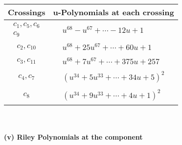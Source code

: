 \documentclass[1p]{elsarticle_modified}
\theoremstyle{definition}
\begin{document}
\begin{tabular}{m{50pt}|m{274pt}}
Crossings & \hspace{64pt}u-Polynomials at each crossing \\
\hline $$\begin{aligned}c_{1},c_{5},c_{6}\\c_{9}\end{aligned}$$&$\begin{aligned}
&u^{68}- u^{67}+\cdots-12 u+1
\end{aligned}$\\
\hline $$\begin{aligned}c_{2},c_{10}\end{aligned}$$&$\begin{aligned}
&u^{68}+25 u^{67}+\cdots+60 u+1
\end{aligned}$\\
\hline $$\begin{aligned}c_{3},c_{11}\end{aligned}$$&$\begin{aligned}
&u^{68}+7 u^{67}+\cdots+375 u+257
\end{aligned}$\\
\hline $$\begin{aligned}c_{4},c_{7}\end{aligned}$$&$\begin{aligned}
&(u^{34}+5 u^{33}+\cdots+34 u+5)^{2}
\end{aligned}$\\
\hline $$\begin{aligned}c_{8}\end{aligned}$$&$\begin{aligned}
&(u^{34}+9 u^{33}+\cdots+4 u+1)^{2}
\end{aligned}$\\
\hline
\end{tabular}\\~\\
\newpage\renewcommand{\arraystretch}{1}
\flushleft \textbf{(v) Riley Polynomials at the component}\newline \\
\end{document}
